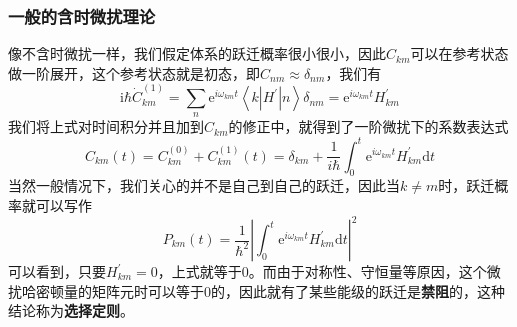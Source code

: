 \documentclass[12pt,a4paper,openany,twoside]{book}
\numberwithin{equation}{section}
\begin{document}
          \subsubsection{一般的含时微扰理论}
          像不含时微扰一样，我们假定体系的跃迁概率很小很小，因此$C_{km}$可以在参考状态做一阶展开，这个参考状态就是初态，即$C_{nm}\approx\delta_{nm}$，我们有
          \begin{equation}
            \mathrm{i} \hbar \dot{C}_{km}^{(1)}=\sum_{n} \mathrm{e}^{i \omega_{km} t}\left\langle k\left|H^{\prime}\right| n\right\rangle \delta_{nm}= \mathrm{e}^{i \omega_{km} t}H_{km}^{\prime}
          \end{equation}
          我们将上式对时间积分并且加到$C_{km}$的修正中，就得到了一阶微扰下的系数表达式
          \begin{equation}
            C_{k m}(t)=C_{k m}^{(0)}+C_{k m}^{(1)}(t)=\delta_{k m}+\frac{1}{i \hbar} \int_{0}^{t} \mathrm{e}^{i \omega_{k m} t} H_{k m}^{\prime} \mathrm{d} t
          \end{equation}
          当然一般情况下，我们关心的并不是自己到自己的跃迁，因此当$k\neq m$时，跃迁概率就可以写作
          \begin{equation}
            P_{k m}(t)=\frac{1}{ \hbar^2} \left|\int_{0}^{t} \mathrm{e}^{i \omega_{k m} t} H_{k m}^{\prime} \mathrm{d} t\right|^2
          \end{equation}
          可以看到，只要$H_{k m}^{\prime} = 0$，上式就等于$0$。而由于对称性、守恒量等原因，这个微扰哈密顿量的矩阵元时可以等于$0$的，因此就有了某些能级的跃迁是\textbf{禁阻}的，这种结论称为\textbf{选择定则}。
\end{document}
